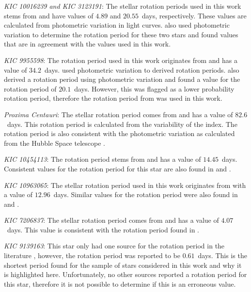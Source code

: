 \textit{KIC 10016239 and KIC 3123191}: The stellar rotation periods used in this work stems from \citet{McQuillan_etal_2014} and have values of $4.89$ and $20.55$~days, respectively. These values are calculated from photometric variation in light curves. \citet{Garcia_etal_2014} also used photometric variation to determine the rotation period for these two stars and found values that are in agreement with the values used in this work.

\textit{KIC 9955598}: The rotation period used in this work originates from \citet{Garcia_etal_2014} and has a value of $34.2$~days. \citet{Garcia_etal_2014} used photometric variation to derived rotation periods. \citet{Paz_Chinchon_etal_2015} also derived a rotation period using photometric variation and found a value for the rotation period of $20.1$~days. However, this was flagged as a lower probability rotation period, therefore the rotation period from \citet{Garcia_etal_2014} was used in this work. 

\textit{Proxima Centauri}: The stellar rotation period comes from \citet{Collins_etal_2017} and has a value of $82.6$~days. This rotation period is calculated from the variability of the \Halpha index. The rotation period is also consistent with the photometric variation as calculated from the Hubble Space telescope \citep{Benedict_etal_1998}.

\textit{KIC 10454113}: The rotation period stems from \citet{McQuillan_etal_2014} and has a value of $14.45$~days. Consistent values for the rotation period for this star are also found in \citet{do_Nascimento_etal_2014} and \citet{Nielsen_etal_2013}.

\textit{KIC 10963065}: The stellar rotation period used in this work originates from \citet{Paz_Chinchon_etal_2015} with a value of $12.96$~days. Similar values for the rotation period were also found in \citet{McQuillan_etal_2013} and \citet{Mazeh_etal_2015}.

\textit{KIC 7206837}: The stellar rotation period comes from \citet{McQuillan_etal_2014} and has a value of $4.07$~days. This value is consistent with the rotation period found in \citet{Nielsen_etal_2013}.

\textit{KIC 9139163}: This star only had one source for the rotation period in the literature \citep{Janes_2017}, however, the rotation period was reported to be $0.61$~days. This is the shortest period found for the sample of stars considered in this work and why it is highlighted here. Unfortunately, no other sources reported a rotation period for this star, therefore it is not possible to determine if this is an erroneous value.

